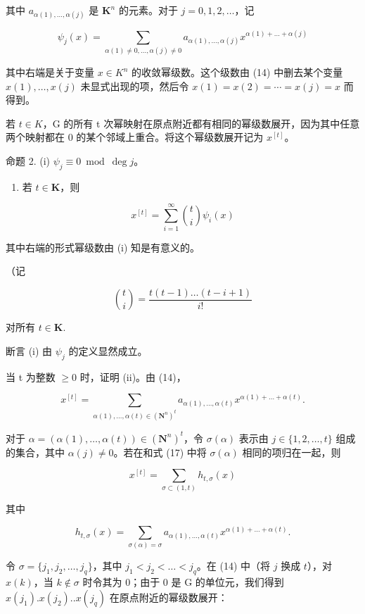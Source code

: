 其中 \(a_{\alpha(1), \ldots, \alpha(j)}\) 是 \(\mathbf{K}^n\) 的元素。对于 \(j = 0, 1, 2, \ldots\)，记

\[
\psi_ {j} (x) = \sum_ {\alpha (1) \neq 0, \dots , \alpha (j) \neq 0} a _ {\alpha (1), \dots , \alpha (j)} x ^ {\alpha (1) + \dots + \alpha (j)}\tag{15}
\]

其中右端是关于变量 \(x \in K^{n}\) 的收敛幂级数。这个级数由 (14) 中删去某个变量 \(x(1), \ldots, x(j)\) 未显式出现的项，然后令 \(x(1) = x(2) = \cdots = x(j) = x\) 而得到。

若 \(t \in K\)，G 的所有 t 次幂映射在原点附近都有相同的幂级数展开，因为其中任意两个映射都在 0 的某个邻域上重合。将这个幂级数展开记为 \(x^{[t]}\)。

命题 2. (i) \(\psi_{j} \equiv 0 \bmod \deg j\)。

\begin{enumerate}
\def\labelenumi{(\roman{enumi})}
\setcounter{enumi}{1}
\tightlist
\item
  若 \(t\in \mathbf{K}\)，则
\end{enumerate}

\[
x ^ {[ t ]} = \sum_ {i = 1} ^ {\infty} \binom {t} {i} \psi_ {i} (x)\tag{16}
\]

其中右端的形式幂级数由 (i) 知是有意义的。

（记

\[
\binom {t} {i} = \frac {t (t - 1) \dots (t - i + 1)}{i !}
\]

对所有 \(t\in \mathbf{K}.\)

断言 (i) 由 \(\psi_{j}\) 的定义显然成立。

当 t 为整数 \(\geqslant0\) 时，证明 (ii)。由 (14)，

\[
x ^ {[ t ]} = \sum_ {\alpha (1),\ldots,\alpha (t)\in(\mathbf{N}^{n})^{t}} a _ {\alpha (1), \dots , \alpha (t)} x ^ {\alpha (1) + \dots + \alpha (t)}.\tag{17}
\]

对于 \(\alpha = (\alpha(1),\ldots,\alpha(t))\in(\mathbf{N}^{n})^{t}\)，令 \(\sigma(\alpha)\) 表示由 \(j\in\{1,2,\ldots,t\}\) 组成的集合，其中 \(\alpha(j)\neq0\)。若在和式 (17) 中将 \(\sigma(\alpha)\) 相同的项归在一起，则

\[
x ^ {[ t ]} = \sum_ {\sigma \subset (1, t)} h _ {t, \sigma} (x)\tag{18}
\]

其中

\[
h _ {t, \sigma} (x) = \sum_ {\sigma (\alpha) = \sigma} a _ {\alpha (1), \dots , \alpha (t)} x ^ {\alpha (1) + \dots + \alpha (t)}.\tag{19}
\]

令 \(\sigma = \{j_1, j_2, \ldots, j_q\}\)，其中 \(j_1 < j_2 < \ldots < j_q\)。在 (14) 中（将 \(j\) 换成 \(t\)），对 \(x(k)\)，当 \(k \notin \sigma\) 时令其为 0；由于 0 是 G 的单位元，我们得到 \(x(j_1).x(j_2)..x(j_q)\) 在原点附近的幂级数展开：

